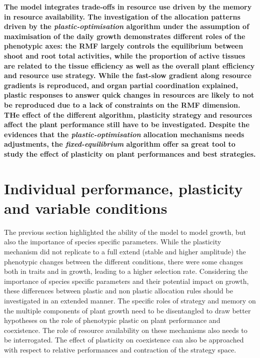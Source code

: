 \textbf{The model \model integrates trade-offs in resource use driven by the memory in resource availability. The investigation of the allocation patterns driven by the \textit{plastic-optimisation}   algorithm under the assumption of maximisation of the daily growth demonstrates different roles of the phenotypic axes: the RMF largely controls the equilibrium between shoot and root total activities, while the proportion of active tissues are related to the tissue efficiency as well as the overall plant efficiency and resource use strategy. While the fast-slow gradient along resource gradients is reproduced, and organ partial coordination explained, plastic responses to answer quick changes in resources are likely to not be reproduced due to a lack of constraints on the RMF dimension. THe effect of the different algorithm, plasticity strategy and resources affect the plant performance still have to be investigated. Despite the evidences that the \textit{plastic-optimisation} allocation mechanisms needs adjustments, the \textit{fixed-equilibrium} algorithm offer sa great tool to study the effect of plasticity on plant performances and best strategies.}


\chapter{Individual performance, plasticity and variable conditions}\label{chapter:individual}

The previous section highlighted the ability of the model to model growth, but also the importance of species specific parameters. While the plasticity mechanism did not replicate to a full extend (stable and higher amplitude) the phenotypic changes between the different conditions, there were some changes both in traits and in growth, leading to a higher selection rate. Considering the importance of species specific parameters and their potential impact on growth, these differences between plastic and non plastic allocation rules should be investigated in an extended manner. The specific roles of strategy and memory on the multiple components of plant growth need to be disentangled to draw better hypotheses on the role of phenotypic plastic on plant performance and coexistence. The role of resource availability on these mechanisms also needs to be interrogated. The effect of plasticity on coexistence can also be approached with respect to relative performances and contraction of the strategy space.


